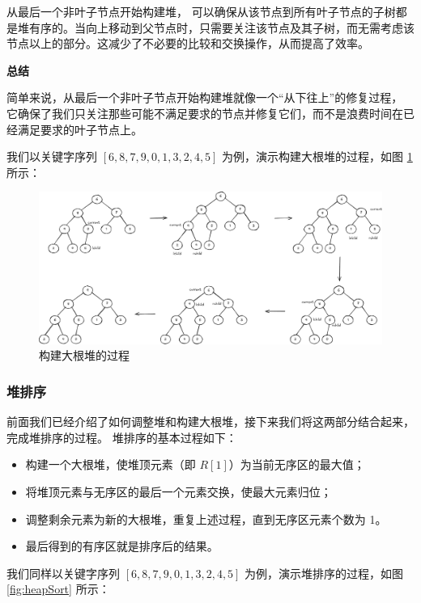 \documentclass[lang=cn,newtx,10pt,scheme=chinese]{../elegantbook}
\begin{document}
   从最后一个非叶子节点开始构建堆，
   可以确保从该节点到所有叶子节点的子树都是堆有序的。当向上移动到父节点时，只需要关注该节点及其子树，而无需考虑该节点以上的部分。这减少了不必要的比较和交换操作，从而提高了效率。


\textbf{总结}  

简单来说，从最后一个非叶子节点开始构建堆就像一个“从下往上”的修复过程，
它确保了我们只关注那些可能不满足要求的节点并修复它们，而不是浪费时间在已经满足要求的叶子节点上。


我们以关键字序列 $[6,8,7,9,0,1,3,2,4,5]$ 为例，演示构建大根堆的过程，如图 \ref{fig:heapBuild} 所示：

\begin{figure}[h!]
    \centering
    \includegraphics[width=1\textwidth]{./figure/pdf/cropped/heapBuild.pdf}
    \caption{构建大根堆的过程}
    \label{fig:heapBuild}
\end{figure}


\subsubsection{堆排序}

前面我们已经介绍了如何调整堆和构建大根堆，接下来我们将这两部分结合起来，完成堆排序的过程。
堆排序的基本过程如下：
\begin{itemize}
  \item 构建一个大根堆，使堆顶元素（即 $R[1]$）为当前无序区的最大值；
  \item 将堆顶元素与无序区的最后一个元素交换，使最大元素归位；
  \item 调整剩余元素为新的大根堆，重复上述过程，直到无序区元素个数为 1。
  \item 最后得到的有序区就是排序后的结果。
  \end{itemize}
我们同样以关键字序列 $[6,8,7,9,0,1,3,2,4,5]$ 为例，演示堆排序的过程，如图 \ref{fig:heapSort} 所示：
\end{document}

